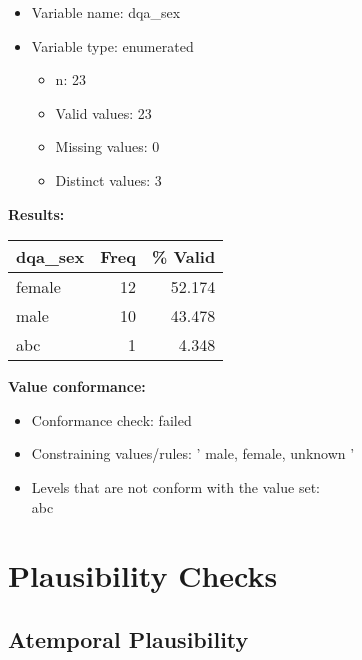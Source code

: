 \documentclass[
]{article}
\providecommand{\tightlist}{%
  \setlength{\itemsep}{0pt}\setlength{\parskip}{0pt}}
\begin{document}
\begin{itemize}
\tightlist
\item
  Variable name: dqa\_sex
\item
  Variable type: enumerated

  \begin{itemize}
  \tightlist
  \item
    n: 23
  \item
    Valid values: 23
  \item
    Missing values: 0
  \item
    Distinct values: 3
  \end{itemize}
\end{itemize}

\textbf{Results:}\\

\begin{table}[H]
\centering
\begin{tabular}{l|r|r}
\hline
\textbf{dqa\_sex} & \textbf{Freq} & \textbf{\% Valid}\\
\hline
female & 12 & 52.174\\
\hline
male & 10 & 43.478\\
\hline
abc & 1 & 4.348\\
\hline
\end{tabular}
\end{table}

\textbf{Value conformance:}

\begin{itemize}
\tightlist
\item
  Conformance check: failed
\item
  Constraining values/rules: ' male, female, unknown '
\item
  Levels that are not conform with the value set:\\
  abc
\end{itemize}

\newpage

\hypertarget{plausibility-checks}{%
\section{Plausibility Checks}\label{plausibility-checks}}

\hypertarget{atemporal-plausibility}{%
\subsection{Atemporal Plausibility}\label{atemporal-plausibility}}
\end{document}
